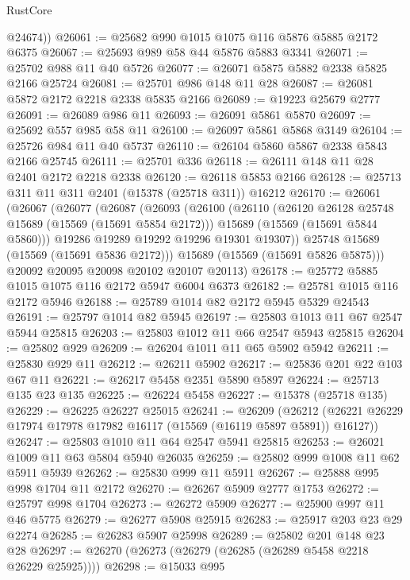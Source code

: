 \begin{lexlean}{RustCore}
\begin{coremodule}
        @24674))
@26061 := @25682 @990 @1015 @1075 @116 @5876 @5885 @2172 @6375
@26067 := @25693 @989 @58 @44 @5876 @5883 @3341
@26071 := @25702 @988 @11 @40 @5726
@26077 := @26071 @5875 @5882 @2338 @5825 @2166 @25724
@26081 := @25701 @986 @148 @11 @28
@26087 := @26081 @5872 @2172 @2218 @2338 @5835 @2166
@26089 := @19223 @25679 @2777
@26091 := @26089 @986 @11
@26093 := @26091 @5861 @5870
@26097 := @25692 @557 @985 @58 @11
@26100 := @26097 @5861 @5868 @3149
@26104 := @25726 @984 @11 @40 @5737
@26110 := @26104 @5860 @5867 @2338 @5843 @2166 @25745
@26111 := @25701 @336
@26118 := @26111 @148 @11 @28 @2401 @2172 @2218 @2338
@26120 := @26118 @5853 @2166
@26128 := @25713 @311 @11 @311 @2401 (@15378 (@25718 @311)) @16212
@26170 := @26061
    (@26067
      (@26077
        (@26087
          (@26093
            (@26100
              (@26110
                (@26120 @26128 @25748 @15689 (@15569 (@15691 @5854 @2172)))
                @15689
                (@15569 (@15691 @5844 @5860)))
              @19286
              @19289
              @19292
              @19296
              @19301
              @19307))
          @25748
          @15689
          (@15569 (@15691 @5836 @2172)))
        @15689
        (@15569 (@15691 @5826 @5875)))
      @20092
      @20095
      @20098
      @20102
      @20107
      @20113)
@26178 := @25772 @5885 @1015 @1075 @116 @2172 @5947 @6004 @6373
@26182 := @25781 @1015 @116 @2172 @5946
@26188 := @25789 @1014 @82 @2172 @5945 @5329 @24543
@26191 := @25797 @1014 @82 @5945
@26197 := @25803 @1013 @11 @67 @2547 @5944 @25815
@26203 := @25803 @1012 @11 @66 @2547 @5943 @25815
@26204 := @25802 @929
@26209 := @26204 @1011 @11 @65 @5902 @5942
@26211 := @25830 @929 @11
@26212 := @26211 @5902
@26217 := @25836 @201 @22 @103 @67 @11
@26221 := @26217 @5458 @2351 @5890 @5897
@26224 := @25713 @135 @23 @135
@26225 := @26224 @5458
@26227 := @15378 (@25718 @135)
@26229 := @26225 @26227 @25015
@26241 := @26209
    (@26212 (@26221 @26229 @17974 @17978 @17982 @16117 (@15569 (@16119 @5897 @5891)) @16127))
@26247 := @25803 @1010 @11 @64 @2547 @5941 @25815
@26253 := @26021 @1009 @11 @63 @5804 @5940 @26035
@26259 := @25802 @999 @1008 @11 @62 @5911 @5939
@26262 := @25830 @999 @11 @5911
@26267 := @25888 @995 @998 @1704 @11 @2172
@26270 := @26267 @5909 @2777 @1753
@26272 := @25797 @998 @1704
@26273 := @26272 @5909
@26277 := @25900 @997 @11 @46 @5775
@26279 := @26277 @5908 @25915
@26283 := @25917 @203 @23 @29 @2274
@26285 := @26283 @5907 @25998
@26289 := @25802 @201 @148 @23 @28
@26297 := @26270 (@26273 (@26279 (@26285 (@26289 @5458 @2218 @26229 @25925))))
@26298 := @15033 @995

\end{coremodule}
\end{lexlean}
